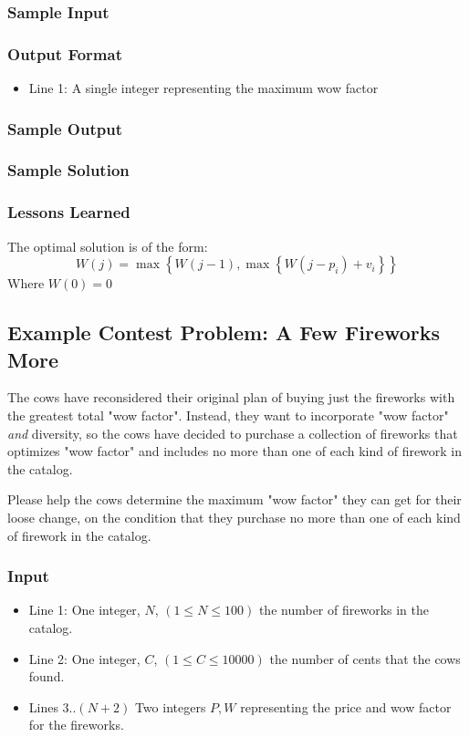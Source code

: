 \subsubsection{Sample Input}


\subsubsection{Output Format}
\begin{itemize}
	\item Line 1: A single integer representing the maximum wow factor
\end{itemize}
\subsubsection{Sample Output}


\subsubsection{Sample Solution}


\subsubsection{Lessons Learned}
The optimal solution is of the form:
$$W(j) = \max \left\{W(j-1), \max \left\{W(j - p_i) + v_i \right\}\right\}$$
Where $W(0) = 0$

\subsection{Example Contest Problem: A Few Fireworks More}
The cows have reconsidered their original plan of buying just the fireworks with the greatest total "wow factor".
Instead, they want to incorporate "wow factor" \emph{and} diversity, so the cows have decided to purchase a collection of fireworks that optimizes "wow factor" and includes no more than one of each kind of firework in the catalog.

Please help the cows determine the maximum "wow factor" they can get for their loose change, on the condition that they purchase no more than one of each kind of firework in the catalog.

\subsubsection{Input}
\begin{itemize}
	\item Line 1: One integer, $N$, $(1 \leq N \leq 100)$ the number of fireworks in the catalog.
	\item Line 2: One integer, $C$, $(1 \leq C \leq 10000)$ the number of cents that the cows found.
	\item Lines 3..$(N+2)$ Two integers $P,W$ representing the price and wow factor for the fireworks.
\end{itemize}

